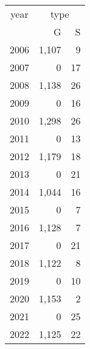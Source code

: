 \footnotesize\begin{tabular}[t]{lrr}
\toprule
\multicolumn{1}{c}{year} & \multicolumn{2}{c}{type} \\
\cmidrule(l{3pt}r{3pt}){1-1} \cmidrule(l{3pt}r{3pt}){2-3}
  & G & S\\
\midrule
2006 & 1,107 & 9\\
2007 & 0 & 17\\
2008 & 1,138 & 26\\
2009 & 0 & 16\\
2010 & 1,298 & 26\\
2011 & 0 & 13\\
2012 & 1,179 & 18\\
2013 & 0 & 21\\
2014 & 1,044 & 16\\
2015 & 0 & 7\\
2016 & 1,128 & 7\\
2017 & 0 & 21\\
2018 & 1,122 & 8\\
2019 & 0 & 10\\
2020 & 1,153 & 2\\
2021 & 0 & 25\\
2022 & 1,125 & 22\\
\bottomrule
\end{tabular}
